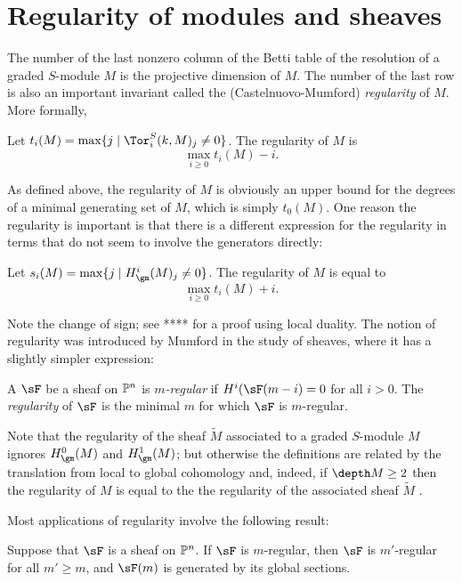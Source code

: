 \section{Regularity of modules and sheaves}
The number of the last nonzero column of the Betti table of the resolution of a graded $S$-module $M$ is the projective dimension of $M$. The number of the last row is also an important invariant called the (Castelnuovo-Mumford) \emph {regularity} of $M$. More formally,
\begin{definition}
Let $t_{i}(M) = \max \{j \mid \Tor^{S}_{i}(k,M)_{j} \neq 0\}$. The regularity of $M$ is
$$
\max_{i \geq 0} t_{i}(M)-i.
$$
\end{definition}

As defined above, the regularity of $M$ is obviously an upper bound for the degrees of a minimal generating
set of $M$, which is simply $t_{0}(M)$. One reason the regularity is important is that there is a different expression for the regularity in terms that do not seem to involve the generators directly:

\begin{theorem}
 Let $s_{i}(M) = \max\{j \mid H^{i}_{\gm}(M)_{j} \neq 0\}$. The regularity of $M$ is equal to
 $$
\max_{i \geq 0} t_{i}(M)+i.
$$
\end{theorem}

Note the change of sign; see **** for a proof using local duality. The notion of regularity was introduced by Mumford in the study of sheaves, where it has a slightly simpler expression:

\begin{definition}
A $\sF$ be a sheaf on $\PP^{n}$ is \emph{$m$-regular} if $H^{i}(\sF(m-i) = 0$ for all $i>0$. The \emph{regularity} of $\sF$ is the minimal $m$ for which $\sF$ is $m$-regular.
\end{definition}

 Note that the regularity
of the sheaf $\tilde M$ associated to a graded $S$-module $M$ ignores $H^{0}_{\gm}(M)$ and 
$H^{1}_{\gm}(M)$; but otherwise the definitions are related by the translation from local to global
cohomology and, indeed, if $\depth M \geq 2$ then the regularity of
$M$ is equal to the the regularity of the associated sheaf $\tilde M$ . 

Most applications of
regularity involve the following result\cite{Mumford1966}:
\begin{theorem}

Suppose that $\sF$ is a sheaf on $\PP^{n}$. If $\sF$ is $m$-regular, then $\sF$ is $m'$-regular for all $m'\geq m$, and $\sF(m)$ is generated by its global sections.
\end{theorem}

